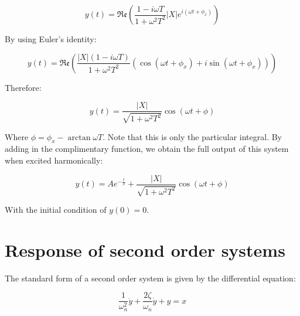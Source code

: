 \documentclass[12pt]{article}
\begin{document}
\[ y(t) = \mathfrak{Re}\left(\frac{1 - i\omega T}{1 + \omega^2T^2}|X|e^{i(\omega t + \phi_x)}\right) \]

By using Euler's identity:

\[ y(t) = \mathfrak{Re}\left(\frac{|X|(1 - i\omega T)}{1 + \omega^2T^2}(\cos{(\omega t + \phi_x)} + i\sin{(\omega t + \phi_x)})\right) \]

Therefore:

\[ y(t) = \frac{|X|}{\sqrt{1 + \omega^2T^2}}\cos{(\omega t + \phi)} \]

Where $\phi = \phi_x - \arctan{\omega T}$. Note that this is only the particular integral. By adding in the complimentary function, we obtain the full output of this system when excited harmonically:

\[ y(t) = Ae^{-\frac{t}{T}} + \frac{|X|}{\sqrt{1 + \omega^2T^2}}\cos{(\omega t + \phi)} \] 

With the initial condition of $y(0) = 0$.

\newpage

\section{Response of second order systems}

\begin{proposition}
  The standard form of a second order system is given by the differential equation:

  \[ \frac{1}{\omega_n^2}\ddot{y} + \frac{2\zeta}{\omega_n}\dot{y} + y = x \]
\end{proposition}
\end{document}
